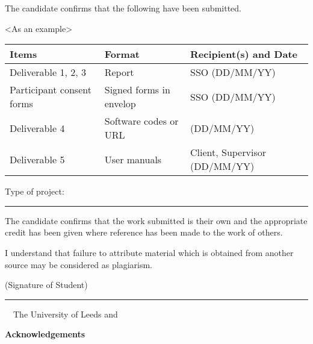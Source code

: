 \frontcover

\clearpage
\noindent The candidate confirms that the following have been submitted.

<As an example>
\begin{table}[ht!]
\begin{tabular}{|p{}|p{}|p{}|}
\hline 
Items & Format & Recipient(s) and Date \\ 
\hline 
Deliverable 1, 2, 3 & Report & SSO (DD/MM/YY) \\ 
\hline 
Participant consent forms & Signed forms in envelop & SSO (DD/MM/YY) \\ 
\hline 
Deliverable 4 & Software codes or URL & (DD/MM/YY) \\ 
\hline 
Deliverable 5 & User manuals & Client, Supervisor (DD/MM/YY) \\ 
\hline 
\end{tabular} 
\end{table}

\noindent Type of project: \rule{100mm}{1pt}
\vspace{\fill}

\noindent The candidate confirms that the work submitted is their own and the appropriate credit has been given where reference has been made to the work of others.
\vspace{\fill}

\noindent I understand that failure to attribute material which is obtained from another source may be considered as plagiarism.

\vspace{\fill}
\flushright(Signature of Student) \rule{50mm}{1pt}
\flushleft
\vspace{\fill}
\textcopyright~\session~The University of Leeds and~\fullname

\begin{dissertationsummary}

\end{dissertationsummary}

\clearpage
\centering\textbf{Acknowledgements}
\flushleft


\tableofcontents


